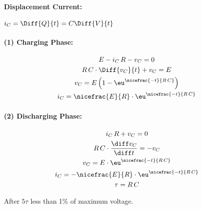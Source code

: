 	\paragraph{Displacement Current:} %
		$i_C = \Diff{Q}{t} = C \Diff{V}{t}$
	\begin{center}
	\end{center}
	\begin{multicols*}{2}
		\paragraph{(1) Charging Phase:} %
		
			\begin{gather*}
				E - i_C \, R - v_C = 0 \\
				R\,C \cdot \Diff{v_C}{t} + v_C = E \\
				v_C = E \left(
					1- \eu^{\nicefrac{-t}{R\,C}}
				\right) \\
				i_C = \nicefrac{E}{R} \cdot \eu^{\nicefrac{-t}{R\,C}}
			\end{gather*}
		
		\paragraph{(2) Discharging Phase:} %
		
			\begin{gather*}
				i_C \, R + v_C = 0 \\
				R \, C \cdot \frac{\diff v_C}{\diff t} = -v_C \\
				v_C = E \cdot \eu^{\nicefrac{-t}{R\,C}} \\
				i_C = - \nicefrac{E}{R} \cdot \eu^{\nicefrac{-t}{R\,C}} \\
				\tau = R\,C
			\end{gather*}
	\end{multicols*}
	After $5\tau$ less than 1\% of maximum voltage.
	
